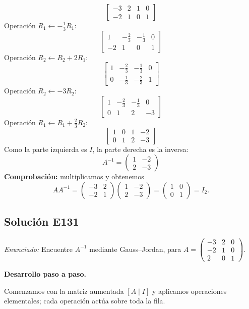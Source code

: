 \documentclass[12pt]{article}
\theoremstyle{remark}
\newcommand{\solucion}[2]{\Needspace{11\baselineskip}\subsection*{Solución E#1}\noindent\textit{Enunciado:} #2\par\medskip\noindent\textbf{Desarrollo paso a paso.}\par\medskip}
\begin{document}
\[
\left[\begin{array}{rr|rr}-3&2&1&0\\-2&1&0&1\end{array}\right]
\]
Operación $R_{1}\leftarrow - \frac{1}{3}R_{1}$:
\[
\left[\begin{array}{rr|rr}1&- \frac{2}{3}&- \frac{1}{3}&0\\-2&1&0&1\end{array}\right]
\]
Operación $R_{2}\leftarrow R_{2}+2R_{1}$:
\[
\left[\begin{array}{rr|rr}1&- \frac{2}{3}&- \frac{1}{3}&0\\0&- \frac{1}{3}&- \frac{2}{3}&1\end{array}\right]
\]
Operación $R_{2}\leftarrow -3R_{2}$:
\[
\left[\begin{array}{rr|rr}1&- \frac{2}{3}&- \frac{1}{3}&0\\0&1&2&-3\end{array}\right]
\]
Operación $R_{1}\leftarrow R_{1}+\frac{2}{3}R_{2}$:
\[
\left[\begin{array}{rr|rr}1&0&1&-2\\0&1&2&-3\end{array}\right]
\]
Como la parte izquierda es $I$, la parte derecha es la inversa:
\[
\boxed{A^{-1}=\begin{pmatrix}1&-2\\2&-3\end{pmatrix}}
\]
\textbf{Comprobación:} multiplicamos y obtenemos
\[
AA^{-1}=\begin{pmatrix}-3&2\\-2&1\end{pmatrix}\begin{pmatrix}1&-2\\2&-3\end{pmatrix}=\begin{pmatrix}1&0\\0&1\end{pmatrix}=I_{2}.
\]

\medskip

\solucion{131}{Encuentre $A^{-1}$ mediante Gauss--Jordan, para $A=\begin{pmatrix}-3&2&0\\-2&1&0\\2&0&1\end{pmatrix}$.}
Comenzamos con la matriz aumentada $[A\mid I]$ y aplicamos operaciones elementales; cada operación actúa sobre toda la fila.
\end{document}
